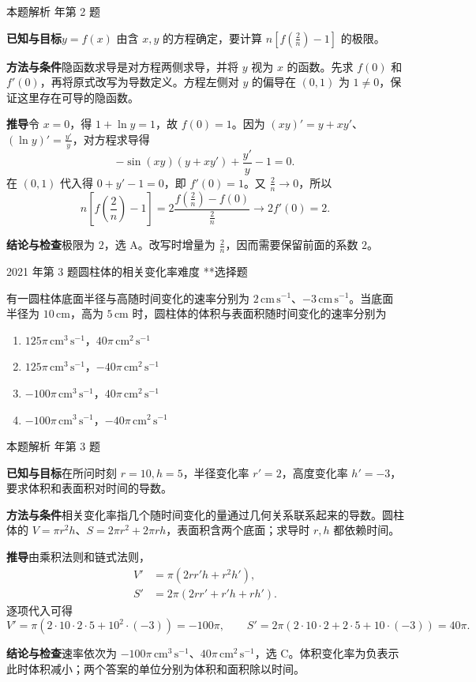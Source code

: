 \documentclass[UTF8,zihao=-4,fontset=fandol]{ctexart}
\newenvironment{abcd}{\begin{enumerate}[label=\textup{(\Alph*)},leftmargin=2.3em,itemsep=1pt,topsep=4pt,parsep=1pt]}{\end{enumerate}}
\newcommand{\choices}[4]{%
  \begin{abcd}
    \item #1
    \item #2
    \item #3
    \item #4
  \end{abcd}}
\newcounter{BankQuestion}
\newcommand{\QuestionPage}[7]{%
  \stepcounter{BankQuestion}%
  \par\noindent\begin{minipage}{\linewidth}
  \raggedright
  {\small\textcolor{black!60}{#3\quad #5\quad 难度 #7}\hfill\textcolor{accent}{#2}}\par\smallskip}
\newcommand{\QuestionEnd}{\end{minipage}\par\medskip}
\newcommand{\QuestionPage}[7]{%
  \clearpage
  \stepcounter{BankQuestion}%
  {\small\textcolor{accent}{#1\hfill #2}}\par\medskip
  {\small\textcolor{black!60}{#3\quad #5\quad 难度 #7\hfill \arabic{BankQuestion} / 234}}\par\vspace{9bp}}
\newcommand{\QuestionEnd}{}
\newenvironment{QuestionSolution}[1]{%
  \clearpage
  {\small\textcolor{black!60}{本题解析\quad #1}}\par\medskip
}{\par\clearpage}
\begin{document}
\begin{QuestionSolution}{2013 年第 2 题}
\textbf{已知与目标}\quad \(y=f(x)\) 由含 \(x,y\) 的方程确定，要计算 \(n[f(\frac{2}{n})-1]\) 的极限。

\textbf{方法与条件}\quad 隐函数求导是对方程两侧求导，并将 \(y\) 视为 \(x\) 的函数。先求 \(f(0)\) 和 \(f'(0)\)，再将原式改写为导数定义。方程左侧对 \(y\) 的偏导在 \((0,1)\) 为 \(1\ne0\)，保证这里存在可导的隐函数。

\textbf{推导}\quad 令 \(x=0\)，得 \(1+\ln y=1\)，故 \(f(0)=1\)。因为 \((xy)'=y+xy'\)、\((\ln y)'=\frac{y'}{y}\)，对方程求导得
\[
-\sin(xy)(y+xy')+\frac{y'}y-1=0.
\]
在 \((0,1)\) 代入得 \(0+y'-1=0\)，即 \(f'(0)=1\)。又 \(\frac{2}{n}\to0\)，所以
\[
n\left[f\left(\frac{2}{n}\right)-1\right]
=2\frac{f(\frac{2}{n})-f(0)}{\frac{2}{n}}\longrightarrow2f'(0)=2.
\]

\textbf{结论与检查}\quad 极限为 \(\boxed{2}\)，选 A。改写时增量为 \(\frac{2}{n}\)，因而需要保留前面的系数 \(2\)。
\end{QuestionSolution}

\QuestionPage{2.2 求导的基本法则}{选择题}{2021 年第 3 题}{1}{圆柱体的相关变化率}{058 / 234}{**}
有一圆柱体底面半径与高随时间变化的速率分别为 \(2\,\mathrm{cm}\,\mathrm{s}^{-1}\)、\(-3\,\mathrm{cm}\,\mathrm{s}^{-1}\)。当底面半径为 \(10\,\mathrm{cm}\)，高为 \(5\,\mathrm{cm}\) 时，圆柱体的体积与表面积随时间变化的速率分别为
\choices{\(125\pi\,\mathrm{cm}^{3}\,\mathrm{s}^{-1}\)，\(40\pi\,\mathrm{cm}^{2}\,\mathrm{s}^{-1}\)}{\(125\pi\,\mathrm{cm}^{3}\,\mathrm{s}^{-1}\)，\(-40\pi\,\mathrm{cm}^{2}\,\mathrm{s}^{-1}\)}{\(-100\pi\,\mathrm{cm}^{3}\,\mathrm{s}^{-1}\)，\(40\pi\,\mathrm{cm}^{2}\,\mathrm{s}^{-1}\)}{\(-100\pi\,\mathrm{cm}^{3}\,\mathrm{s}^{-1}\)，\(-40\pi\,\mathrm{cm}^{2}\,\mathrm{s}^{-1}\)}
\QuestionEnd

\begin{QuestionSolution}{2021 年第 3 题}
\textbf{已知与目标}\quad 在所问时刻 \(r=10,h=5\)，半径变化率 \(r'=2\)，高度变化率 \(h'=-3\)，要求体积和表面积对时间的导数。

\textbf{方法与条件}\quad 相关变化率指几个随时间变化的量通过几何关系联系起来的导数。圆柱体的 \(V=\pi r^2h\)、\(S=2\pi r^2+2\pi rh\)，表面积含两个底面；求导时 \(r,h\) 都依赖时间。

\textbf{推导}\quad 由乘积法则和链式法则，
\[
\begin{aligned}
V'&=\pi(2rr'h+r^2h'),\\
S'&=2\pi(2rr'+r'h+rh').
\end{aligned}
\]
逐项代入可得
\[
V'=\pi(2\cdot10\cdot2\cdot5+10^2\cdot(-3))=-100\pi,
\qquad S'=2\pi(2\cdot10\cdot2+2\cdot5+10\cdot(-3))=40\pi.
\]

\textbf{结论与检查}\quad 速率依次为 \(\boxed{-100\pi\,\mathrm{cm}^3\,\mathrm{s}^{-1}}\)、\(\boxed{40\pi\,\mathrm{cm}^2\,\mathrm{s}^{-1}}\)，选 C。体积变化率为负表示此时体积减小；两个答案的单位分别为体积和面积除以时间。
\end{QuestionSolution}
\end{document}
